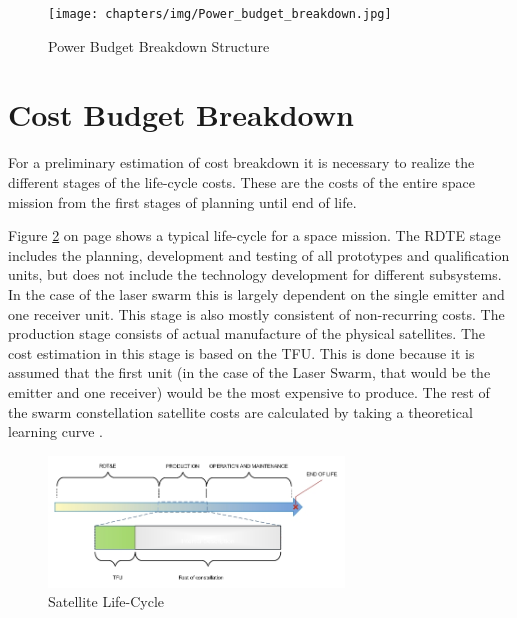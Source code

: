\begin{figure}
\centering
\texttt{[image: chapters/img/Power\_budget\_breakdown.jpg]}
\caption{Power Budget Breakdown Structure}
\label{fig:powerbudget}
\end{figure}


\section{Cost Budget Breakdown}
\label{blBudgetCost}
For a preliminary estimation of cost breakdown it is necessary to realize the different stages of the life-cycle costs. These are the costs of the entire space mission from the first stages of planning until end of life.
%


Figure \ref{fig:lifecycle} on page \pageref{fig:lifecycle} shows a typical life-cycle for a space mission. The \ac{RDTE} stage includes the planning, development and testing of all prototypes and qualification units, but does not include the technology development for different subsystems. In the case of the laser swarm this is largely dependent on the single emitter and one receiver unit. This stage is also mostly consistent of non-recurring costs. The production stage consists of actual manufacture of the physical satellites. The cost estimation in this stage is based on the \ac{TFU}. This is done because it is assumed that the first unit (in the case of the Laser Swarm, that would be the emitter and one receiver) would be the most expensive to produce. The rest of the swarm constellation satellite costs are calculated by taking a theoretical learning curve \cite{larson}. 

\begin{figure}[!h]
\begin{center}

\includegraphics[width=0.7\textwidth]{chapters/img/lifetime.jpg}
\caption{Satellite Life-Cycle}
\label{fig:lifecycle}
\end{center}
\end{figure}

